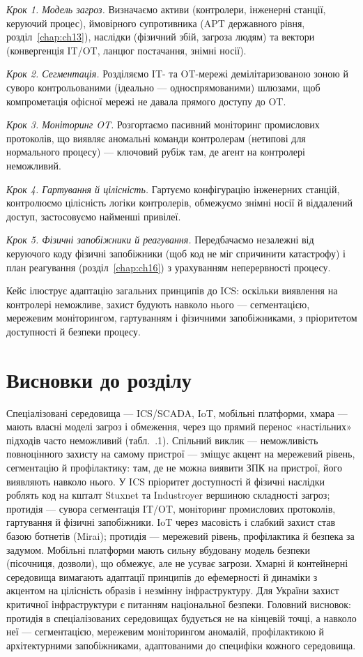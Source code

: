 \emph{Крок 1. Модель загроз.} Визначаємо активи (контролери, інженерні станції, керуючий процес), ймовірного супротивника (APT державного рівня, розділ~\ref{chap:ch13}), наслідки (фізичний збій, загроза людям) та вектори (конвергенція IT/OT, ланцюг постачання, знімні носії).

\emph{Крок 2. Сегментація.} Розділяємо IT- та OT-мережі демілітаризованою зоною й суворо контрольованими (ідеально --- односпрямованими) шлюзами, щоб компрометація офісної мережі не давала прямого доступу до OT.

\emph{Крок 3. Моніторинг OT.} Розгортаємо пасивний моніторинг промислових протоколів, що виявляє аномальні команди контролерам (нетипові для нормального процесу) --- ключовий рубіж там, де агент на контролері неможливий.

\emph{Крок 4. Гартування й цілісність.} Гартуємо конфігурацію інженерних станцій, контролюємо цілісність логіки контролерів, обмежуємо знімні носії й віддалений доступ, застосовуємо найменші привілеї.

\emph{Крок 5. Фізичні запобіжники й реагування.} Передбачаємо незалежні від керуючого коду фізичні запобіжники (щоб код не міг спричинити катастрофу) і план реагування (розділ~\ref{chap:ch16}) з урахуванням неперервності процесу.

Кейс ілюструє адаптацію загальних принципів до ICS: оскільки виявлення на контролері неможливе, захист будують навколо нього --- сегментацією, мережевим моніторингом, гартуванням і фізичними запобіжниками, з пріоритетом доступності й безпеки процесу.

\section*{Висновки до розділу}

Спеціалізовані середовища --- ICS/SCADA, IoT, мобільні платформи, хмара --- мають власні моделі загроз і обмеження, через що прямий перенос «настільних» підходів часто неможливий (табл.~\thechapter.1). Спільний виклик --- неможливість повноцінного захисту на самому пристрої --- зміщує акцент на мережевий рівень, сегментацію й профілактику: там, де не можна виявити ЗПК на пристрої, його виявляють навколо нього. У ICS пріоритет доступності й фізичні наслідки роблять код на кшталт Stuxnet та Industroyer вершиною складності загроз; протидія --- сувора сегментація IT/OT, моніторинг промислових протоколів, гартування й фізичні запобіжники. IoT через масовість і слабкий захист став базою ботнетів (Mirai); протидія --- мережевий рівень, профілактика й безпека за задумом. Мобільні платформи мають сильну вбудовану модель безпеки (пісочниця, дозволи), що обмежує, але не усуває загрози. Хмарні й контейнерні середовища вимагають адаптації принципів до ефемерності й динаміки з акцентом на цілісність образів і незмінну інфраструктуру. Для України захист критичної інфраструктури є питанням національної безпеки. Головний висновок: протидія в спеціалізованих середовищах будується не на кінцевій точці, а навколо неї --- сегментацією, мережевим моніторингом аномалій, профілактикою й архітектурними запобіжниками, адаптованими до специфіки кожного середовища.

